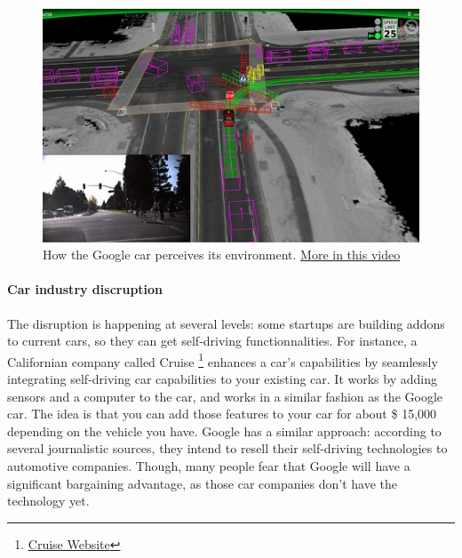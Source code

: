 \documentclass[12pt]{article}
\begin{document}
\smallskip

\begin{figure}[h]
    \centering
    \includegraphics[width=\linewidth]{google-car}
    \caption{How the Google car perceives its environment.
    \href{https://www.youtube.com/watch?v=dk3oc1Hr62g}{More in this video}}
    \label{fig:google_car}
\end{figure}


\smallskip

\paragraph{Car industry discruption}

The disruption is happening at several levels: some startups are building addons
to current cars, so they can get self-driving functionnalities. For instance,
a Californian company called Cruise
\footnote{\href{http://www.getcruise.com}{Cruise Website}}
enhances a car's capabilities by seamlessly integrating self-driving car
capabilities to your existing car. It works by adding sensors and a computer to
the car, and works in a similar fashion as the Google car. The idea is that you
can add those features to your car for about \$ 15,000 depending on the vehicle
you have. Google has a similar approach: according to several journalistic
sources, they intend to resell their self-driving technologies to automotive
companies. Though, many people fear that Google will have a significant
bargaining advantage, as those car companies don't have the technology yet.
\end{document}
